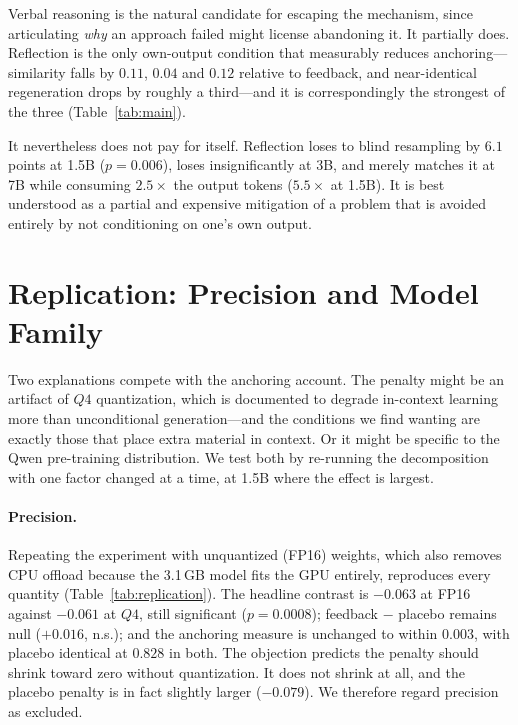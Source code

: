 Verbal reasoning \cite{shinn2023reflexion} is the natural candidate for
escaping the mechanism, since articulating \emph{why} an approach failed might
license abandoning it. It partially does. Reflection is the only own-output
condition that measurably reduces anchoring---similarity falls by $0.11$,
$0.04$ and $0.12$ relative to feedback, and near-identical regeneration drops
by roughly a third---and it is correspondingly the strongest of the three
(Table~\ref{tab:main}).

It nevertheless does not pay for itself. Reflection loses to blind resampling
by $6.1$ points at 1.5B ($p{=}0.006$), loses insignificantly at 3B, and merely
matches it at 7B while consuming $2.5\times$ the output tokens ($5.5\times$ at
1.5B). It is best understood as a partial and expensive mitigation of a problem
that is avoided entirely by not conditioning on one's own output.

\section{Replication: Precision and Model Family}
\label{sec:replication}

Two explanations compete with the anchoring account. The penalty might be an
artifact of $Q4$ quantization, which is documented to degrade in-context
learning more than unconditional generation---and the conditions we find
wanting are exactly those that place extra material in context. Or it might be
specific to the Qwen pre-training distribution. We test both by re-running the
decomposition with one factor changed at a time, at 1.5B where the effect is
largest.

\paragraph{Precision.}
Repeating the experiment with unquantized (FP16) weights, which also removes
CPU offload because the 3.1\,GB model fits the GPU entirely, reproduces every
quantity (Table~\ref{tab:replication}). The headline contrast is
$-0.063$ at FP16 against $-0.061$ at $Q4$, still significant
($p{=}0.0008$); \textsf{feedback} $-$ \textsf{placebo} remains null
($+0.016$, n.s.); and the anchoring measure is unchanged to within $0.003$,
with placebo identical at $0.828$ in both. The objection predicts the penalty
should shrink toward zero without quantization. It does not shrink at all, and
the placebo penalty is in fact slightly larger ($-0.079$). We therefore regard
precision as excluded.

